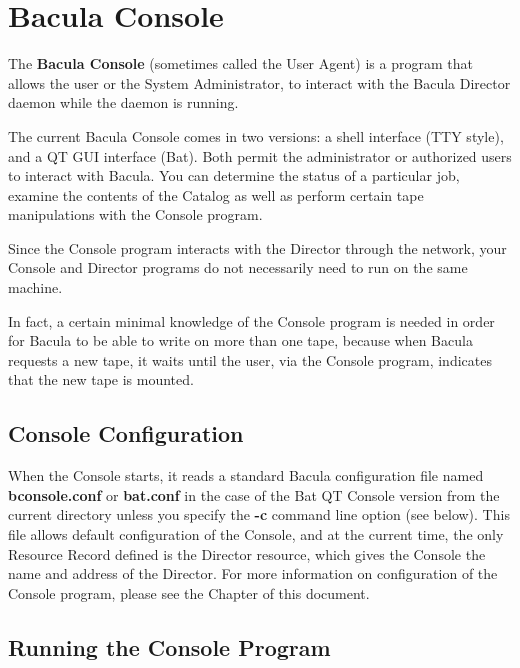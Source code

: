 
\chapter{Bacula Console}
\label{_ConsoleChapter}

The {\bf Bacula Console} (sometimes called the User Agent) is a program that
allows the user or the System Administrator, to interact with the Bacula
Director daemon while the daemon is running. 

The current Bacula Console comes in two versions: a shell interface (TTY
style), and a QT GUI interface (Bat). Both permit the administrator or
authorized users to interact with Bacula. You can determine the status of a
particular job, examine the contents of the Catalog as well as perform certain
tape manipulations with the Console program.

Since the Console program interacts with the Director through the network, your
Console and Director programs do not necessarily need to run on the same
machine. 

In fact, a certain minimal knowledge of the Console program is needed in order
for Bacula to be able to write on more than one tape, because when Bacula
requests a new tape, it waits until the user, via the Console program,
indicates that the new tape is mounted. 

\section{Console Configuration}

When the Console starts, it reads a standard Bacula configuration file
named {\bf bconsole.conf} or {\bf bat.conf} in the case of the Bat
QT Console version from the current directory unless you specify the {\bf {-}c}
command line option (see below). This file allows default configuration 
of the Console, and at the current time, the only Resource Record defined
is the Director resource, which gives the Console the name and address of
the Director.  For more information on configuration of the Console
program, please see the  Chapter of this document.

\section{Running the Console Program}

